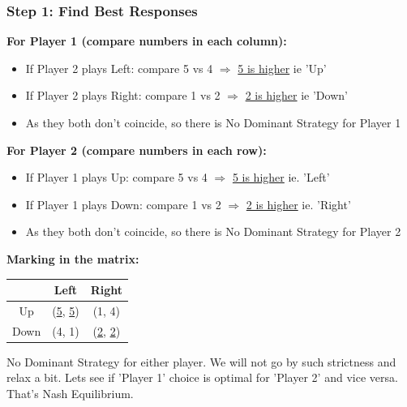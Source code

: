 \begin{frame}[fragile]\frametitle{Step 1: Find Best Responses}

\textbf{For Player 1 (compare numbers in each column):}

\begin{itemize}
  \item If Player 2 plays Left: compare 5 vs 4 $\Rightarrow$ \underline{5 is higher} ie 'Up'
  \item If Player 2 plays Right: compare 1 vs 2 $\Rightarrow$ \underline{2 is higher} ie 'Down'
  \item As they both don't coincide, so there is No Dominant Strategy for Player 1
\end{itemize}

\vspace{6pt}

\textbf{For Player 2 (compare numbers in each row):}

\begin{itemize}
  \item If Player 1 plays Up: compare 5 vs 4 $\Rightarrow$ \underline{5 is higher} ie. 'Left'
  \item If Player 1 plays Down: compare 1 vs 2 $\Rightarrow$ \underline{2 is higher} ie. 'Right'
  \item As they both don't coincide, so there is No Dominant Strategy for Player 2
\end{itemize}


\vspace{2pt}

\textbf{Marking in the matrix:}

\begin{center}
\begin{tabular}{|c|c|c|}
  \hline
  & Left & Right \\
  \hline
  Up & (\underline{5}, \underline{5}) & (1, 4) \\
  \hline
  Down & (4, 1) & (\underline{2}, \underline{2}) \\
  \hline
\end{tabular}
\end{center}

No Dominant Strategy for either player. We will not go by such strictness and relax a bit.
Lets see if 'Player 1' choice is optimal for 'Player 2' and vice versa. That's Nash Equilibrium.

\end{frame}

